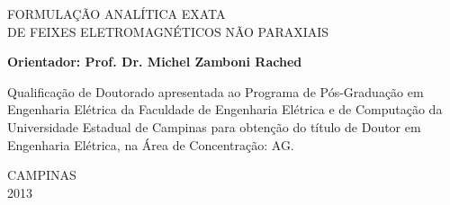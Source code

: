 \vspace*{1.3cm}

\begin{center}
{\sc \large FORMULAÇÃO ANALÍTICA EXATA\\
 DE FEIXES ELETROMAGNÉTICOS NÃO PARAXIAIS}
\end{center}


\vspace*{1.3cm}

{\bf Orientador: Prof. Dr. Michel Zamboni Rached}


\vspace*{1.0cm} %

\begin{flushright}
\begin{minipage}{9.0cm}
Qualificação de Doutorado apresentada ao Programa de Pós-Graduação em Engenharia Elétrica da Faculdade de Engenharia Elétrica e de Computação da Universidade Estadual de Campinas para obtenção do título de Doutor em Engenharia Elétrica, na Área de Concentração: AG.


\end{minipage}
\end{flushright}

\null \vfill
\begin{minipage}{7cm}
\small
\end{minipage}

\vspace*{0.9cm} %

\begin{center}
CAMPINAS\\2013
\end{center}




